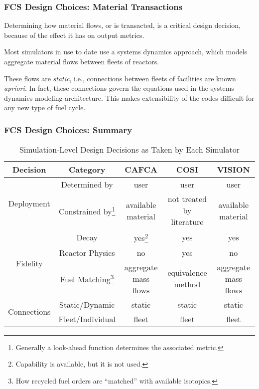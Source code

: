 \begin{frame}[ctb!]
  \frametitle{FCS Design Choices: Material Transactions}

  Determining how material flows, or is transacted, is a critical design
  decision, because of the effect it has on output metrics.\vspace{0.2cm}
  
  Most simulators in use to date use a systems dynamics approach, which models
  aggregate material flows between fleets of reactors.\vspace{0.2cm}

  These flows are \textit{static}, i.e., connections between fleets of
  facilities are known \textit{apriori}. In fact, these connections govern the
  equations used in the systems dynamics modeling architecture. This makes
  extensibility of the codes difficult for any new type of fuel cycle.
\end{frame}

\begin{frame}[ctb!]
  \frametitle{FCS Design Choices: Summary}
  
    \begin{table} [h!]
      \small
      \centering
      \begin{tabular} {|c|c|c|c|c|}
        \hline
        Decision                     & Category & CAFCA & COSI & VISION \\ 
        \hline
        \multirow{2}{*}{Deployment}  & Determined by 
        & user & user & user \\ \cline{2-5}
        & Constrained by\footnote{Generally a look-ahead function determines the associated metric.}   
        & available material & not treated by literature & available material \\ \hline
        \multirow{3}{*}{Fidelity}    & Decay 
        & yes\footnote{Capability is available, but it is not used.} & yes & yes \\ \cline{2-5}
        & Reactor Physics 
        & no & yes & no \\ \cline{2-5}
        & Fuel Matching\footnote{How recycled fuel orders are ``matched'' with available isotopics.} 
        & aggregate mass flows & equivalence method & aggregate mass flows \\ \hline
        \multirow{2}{*}{Connections} & Static/Dynamic 
        & static & static & static \\ \cline{2-5}
        & Fleet/Individual 
        & fleet & fleet & fleet \\
        \hline
      \end{tabular}
      \caption{Simulation-Level Design Decisions as Taken by Each Simulator}
      \label{tab:sim-summary}
    \end{table}

\end{frame}
